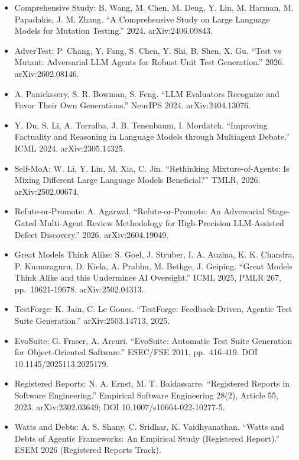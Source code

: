 \documentclass[
  11pt,
]{article}
\begin{document}
\begin{itemize}
  LLMorpheus: F. Tip, J. Bell, M. Schafer. ``LLMorpheus: Mutation
  Testing using Large Language Models.'' 2024. arXiv:2404.09952.
\item
  Comprehensive Study: B. Wang, M. Chen, M. Deng, Y. Lin, M. Harman, M.
  Papadakis, J. M. Zhang. ``A Comprehensive Study on Large Language
  Models for Mutation Testing.'' 2024. arXiv:2406.09843.
\item
  AdverTest: P. Chang, Y. Fang, S. Chen, Y. Shi, B. Shen, X. Gu. ``Test
  vs Mutant: Adversarial LLM Agents for Robust Unit Test Generation.''
  2026. arXiv:2602.08146.
\item
  A. Panickssery, S. R. Bowman, S. Feng. ``LLM Evaluators Recognize and
  Favor Their Own Generations.'' NeurIPS 2024. arXiv:2404.13076.
\item
  Y. Du, S. Li, A. Torralba, J. B. Tenenbaum, I. Mordatch. ``Improving
  Factuality and Reasoning in Language Models through Multiagent
  Debate.'' ICML 2024. arXiv:2305.14325.
\item
  Self-MoA: W. Li, Y. Lin, M. Xia, C. Jin. ``Rethinking
  Mixture-of-Agents: Is Mixing Different Large Language Models
  Beneficial?'' TMLR, 2026. arXiv:2502.00674.
\item
  Refute-or-Promote: A. Agarwal. ``Refute-or-Promote: An Adversarial
  Stage-Gated Multi-Agent Review Methodology for High-Precision
  LLM-Assisted Defect Discovery.'' 2026. arXiv:2604.19049.
\item
  Great Models Think Alike: S. Goel, J. Struber, I. A. Auzina, K. K.
  Chandra, P. Kumaraguru, D. Kiela, A. Prabhu, M. Bethge, J. Geiping.
  ``Great Models Think Alike and this Undermines AI Oversight.'' ICML
  2025, PMLR 267, pp.~19621-19678. arXiv:2502.04313.
\item
  TestForge: K. Jain, C. Le Goues. ``TestForge: Feedback-Driven, Agentic
  Test Suite Generation.'' arXiv:2503.14713, 2025.
\item
  EvoSuite: G. Fraser, A. Arcuri. ``EvoSuite: Automatic Test Suite
  Generation for Object-Oriented Software.'' ESEC/FSE 2011, pp.~416-419.
  DOI 10.1145/2025113.2025179.
\item
  Registered Reports: N. A. Ernst, M. T. Baldassarre. ``Registered
  Reports in Software Engineering.'' Empirical Software Engineering
  28(2), Article 55, 2023. arXiv:2302.03649; DOI
  10.1007/s10664-022-10277-5.
\item
  Watts and Debts: A. S. Shany, C. Sridhar, K. Vaidhyanathan.
  ``Watts and Debts of Agentic Frameworks: An Empirical Study
  (Registered Report).'' ESEM 2026 (Registered Reports Track).

\end{itemize}
\end{document}
